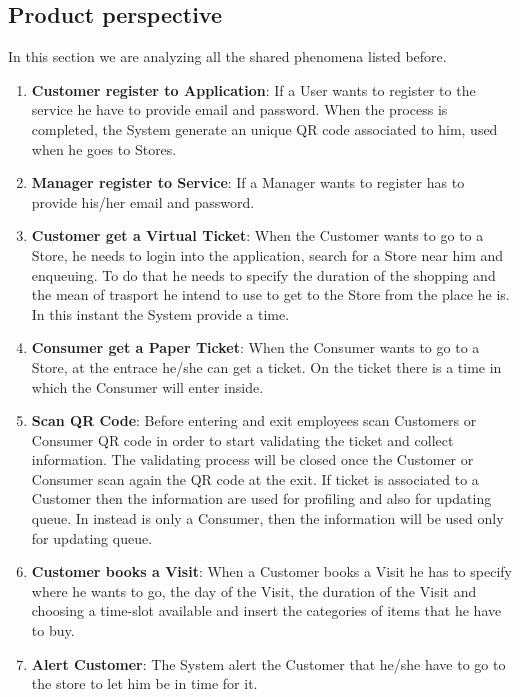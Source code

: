 \documentclass[a4paper, 12pt, oneside]{article}
\begin{document}
\subsection{Product perspective}
In this section we are analyzing all the shared phenomena listed before.
\begin{enumerate}
\item \textbf{Customer register to Application}: If a User wants to register to the service he have to provide email and password.
When the process is completed, the System generate an unique QR code associated to him, used when he goes to Stores.

\item \textbf{Manager register to Service}: If a Manager wants to register has to provide his/her email and password. 

\item \textbf{Customer get a Virtual Ticket}: When the Customer wants to go to a Store, he needs to login into the application, search for a Store near him and enqueuing. To do that he needs to specify the duration of the shopping and the mean of trasport he intend to use to get to the Store from the place he is. In this instant the System provide a time.

\item \textbf{Consumer get a Paper Ticket}:  When the Consumer wants to go to a Store, at the entrace he/she can get a ticket. On the ticket there is a time in which the Consumer will enter inside.

\item \textbf{Scan QR Code}: Before entering and exit employees scan Customers or Consumer QR code in order to start validating the ticket and collect information. The validating process will be closed once the Customer or Consumer scan again the QR code at the exit.
If ticket is associated to a Customer then the information are used for profiling and also for updating queue. In instead is only a Consumer, then the information will be used only for updating queue.

\item \textbf{Customer books a Visit}: When a Customer books a Visit he has to specify where he wants to go, the day of the Visit, the duration of the Visit and choosing a time-slot available and insert the categories of items that he have to buy. 

\item \textbf{Alert Customer}: The System alert the Customer that he/she have to go to the store to let him be in time for it.


\end{enumerate}
\end{document}

